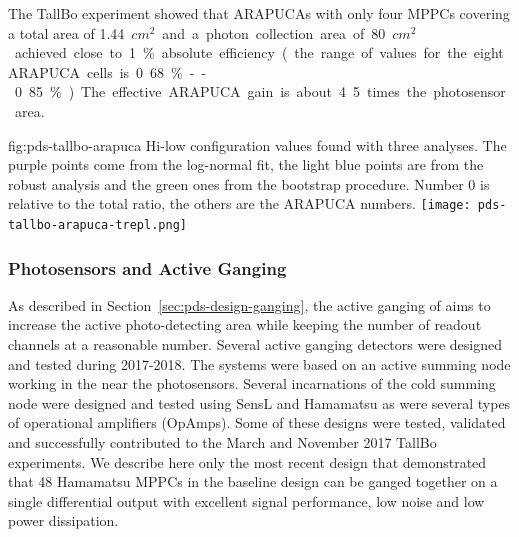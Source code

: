 The TallBo experiment showed that ARAPUCAs with only four MPPCs %
covering a total area of \SI{1.44}{$cm^2$} and a photon collection area of \SI{80}{$cm^2$} achieved close to 1\% absolute efficiency (the range of values for the eight ARAPUCA cells is 0.68\%--0.85\%). The effective ARAPUCA gain is about 4.5 times the photosensor area.

\begin{dunefigure}
 {fig:pds-tallbo-arapuca}
 {Hi-low configuration values found with three analyses. The purple points come
from the log-normal fit, the light blue points are from the robust analysis and the green ones from
the bootstrap procedure. Number 0 is relative to the total ratio, the others are the ARAPUCA
numbers.}
\texttt{[image: pds-tallbo-arapuca-trepl.png]}
\end{dunefigure}


\subsubsection{Photosensors and Active Ganging}
\label{sec:pds-valid-ganging}

As described in Section~\ref{sec:pds-design-ganging}, the active ganging of   aims to increase the active photo-detecting area while keeping the number of readout channels at a reasonable number. 
Several active ganging detectors were designed and tested during 2017-2018. 
The systems were based on an active summing node working in the \lar near the photosensors. Several incarnations of the cold summing node were designed and tested using SensL and Hamamatsu    %
as were several types of operational amplifiers (OpAmps). 
Some of these designs were tested, validated and successfully contributed to the March and November 2017 TallBo experiments.  
We describe here only the most recent design that demonstrated that 48 Hamamatsu MPPCs in the baseline design can be ganged together on a single differential output with excellent signal performance, low noise and low power dissipation.

